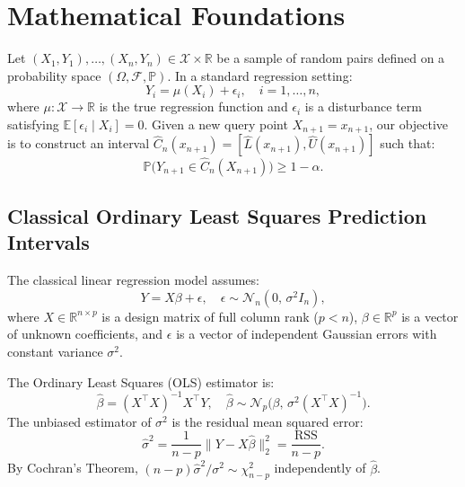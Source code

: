 \documentclass[journal]{IEEEtran}
\begin{document}
\section{Mathematical Foundations}\label{sec:math}
Let $(X_1, Y_1), \dots, (X_n, Y_n) \in \mathcal{X} \times \mathbb{R}$ be a sample of random pairs defined on a probability space $(\Omega, \mathcal{F}, \mathbb{P})$. In a standard regression setting:
\begin{equation}
Y_i = \mu(X_i) + \epsilon_i, \quad i = 1, \dots, n,
\end{equation}
where $\mu: \mathcal{X} \to \mathbb{R}$ is the true regression function and $\epsilon_i$ is a disturbance term satisfying $\mathbb{E}[\epsilon_i \mid X_i] = 0$. Given a new query point $X_{n+1} = x_{n+1}$, our objective is to construct an interval $\hat{C}_n(x_{n+1}) = [\hat{L}(x_{n+1}), \hat{U}(x_{n+1})]$ such that:
\begin{equation}
\mathbb{P}\big(Y_{n+1} \in \hat{C}_n(X_{n+1})\big) \ge 1 - \alpha.
\end{equation}

\subsection{Classical Ordinary Least Squares Prediction Intervals}
The classical linear regression model assumes:
\begin{equation}
Y = X \beta + \epsilon, \quad \epsilon \sim \mathcal{N}_n(0, \, \sigma^2 I_n),
\end{equation}
where $X \in \mathbb{R}^{n \times p}$ is a design matrix of full column rank ($p < n$), $\beta \in \mathbb{R}^p$ is a vector of unknown coefficients, and $\epsilon$ is a vector of independent Gaussian errors with constant variance $\sigma^2$.

The Ordinary Least Squares (OLS) estimator is:
\begin{equation}
\hat{\beta} = (X^\top X)^{-1} X^\top Y, \quad \hat{\beta} \sim \mathcal{N}_p\big(\beta, \, \sigma^2 (X^\top X)^{-1}\big).
\end{equation}
The unbiased estimator of $\sigma^2$ is the residual mean squared error:
\begin{equation}
\hat{\sigma}^2 = \frac{1}{n - p} \|Y - X \hat{\beta}\|_2^2 = \frac{\text{RSS}}{n - p}.
\end{equation}
By Cochran's Theorem, $(n - p)\hat{\sigma}^2 / \sigma^2 \sim \chi^2_{n-p}$ independently of $\hat{\beta}$.
\end{document}
